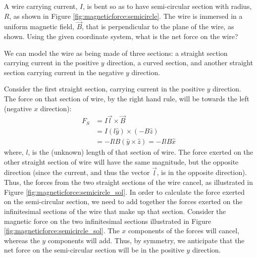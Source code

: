 \begin{example}{\label{ex:magneticforce:semicircle}A wire carrying current, $I$, is bent so as to have semi-circular section with radius, $R$, as shown in Figure \ref{fig:magneticforce:semicircle}. The wire is immersed in a uniform magnetic field, $\vec B$, that is perpendicular to the plane of the wire, as shown. Using the given coordinate system, what is the net force on the wire? }

We can model the wire as being made of three sections: a straight section carrying current in the positive $y$ direction, a curved section, and another straight section carrying current in the negative $y$ direction.

Consider the first straight section, carrying current in the positive $y$ direction. The force on that section of wire, by the right hand rule, will be towards the left (negative $x$ direction):
\begin{align*}
F_S &= I \vec l \times \vec B\\
&= I (l\hat y) \times (-B\hat z)\\
&= -IlB (\hat y \times \hat z)=-IlB\hat x
\end{align*}
where, $l$, is the (unknown) length of that section of wire. The force exerted on the other straight section of wire will have the same magnitude, but the opposite direction (since the current, and thus the vector $\vec l$, is in the opposite direction). Thus, the forces from the two straight sections of the wire cancel, as illustrated in Figure \ref{fig:magneticforce:semicircle_sol}.
In order to calculate the force exerted on the semi-circular section, we need to add together the forces exerted on the infinitesimal sections of the wire that make up that section. Consider the magnetic force on the two infinitesimal sections illustrated in Figure \ref{fig:magneticforce:semicircle_sol}. The $x$ components of the forces will cancel, whereas the $y$ components will add. Thus, by symmetry, we anticipate that the net force on the semi-circular section will be in the positive $y$ direction.


\end{example}
